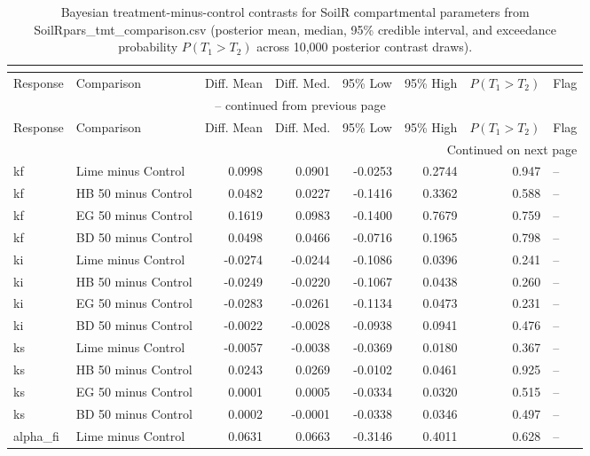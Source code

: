 \documentclass[preprint,12pt]{elsarticle}
\begin{document}
\begin{landscape}
\newpage

\begin{longtable}{llrrrrrl}
\caption{Bayesian treatment-minus-control contrasts for SoilR compartmental parameters from SoilRpars_tmt_comparison.csv (posterior mean, median, 95\% credible interval, and exceedance probability $P(T_1 > T_2)$ across 10,000 posterior contrast draws).}\\
\label{tab:soilr_tmt}\\
\toprule
Response & Comparison & Diff. Mean & Diff. Med. & 95\% Low & 95\% High & $P(T_1 > T_2)$ & Flag \\
\midrule
\endfirsthead
\multicolumn{8}{c}{{\tablename\ \thetable{} -- continued from previous page}} \\
\toprule
Response & Comparison & Diff. Mean & Diff. Med. & 95\% Low & 95\% High & $P(T_1 > T_2)$ & Flag \\
\midrule
\endhead
\midrule \multicolumn{8}{r}{{Continued on next page}} \\ \endfoot
\bottomrule \endlastfoot
kf & Lime minus Control & 0.0998 & 0.0901 & -0.0253 & 0.2744 & 0.947 & -- \\
kf & HB 50 minus Control & 0.0482 & 0.0227 & -0.1416 & 0.3362 & 0.588 & -- \\
kf & EG 50 minus Control & 0.1619 & 0.0983 & -0.1400 & 0.7679 & 0.759 & -- \\
kf & BD 50 minus Control & 0.0498 & 0.0466 & -0.0716 & 0.1965 & 0.798 & -- \\
ki & Lime minus Control & -0.0274 & -0.0244 & -0.1086 & 0.0396 & 0.241 & -- \\
ki & HB 50 minus Control & -0.0249 & -0.0220 & -0.1067 & 0.0438 & 0.260 & -- \\
ki & EG 50 minus Control & -0.0283 & -0.0261 & -0.1134 & 0.0473 & 0.231 & -- \\
ki & BD 50 minus Control & -0.0022 & -0.0028 & -0.0938 & 0.0941 & 0.476 & -- \\
ks & Lime minus Control & -0.0057 & -0.0038 & -0.0369 & 0.0180 & 0.367 & -- \\
ks & HB 50 minus Control & 0.0243 & 0.0269 & -0.0102 & 0.0461 & 0.925 & -- \\
ks & EG 50 minus Control & 0.0001 & 0.0005 & -0.0334 & 0.0320 & 0.515 & -- \\
ks & BD 50 minus Control & 0.0002 & -0.0001 & -0.0338 & 0.0346 & 0.497 & -- \\
alpha\_fi & Lime minus Control & 0.0631 & 0.0663 & -0.3146 & 0.4011 & 0.628 & -- \\

\end{longtable}
\end{landscape}
\end{document}
